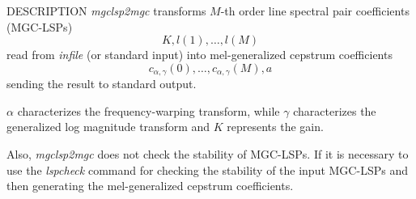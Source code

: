 \begin{synopsis}
\item [mgclsp2mgc] [ --a $A$ ] [ --g $G$ ] [ --m $M$ ] [ --i $I$ ]
 [ --s $S$ ] [ --l] [ {\em infile} ]
\end{synopsis}

\begin{qsection}{DESCRIPTION}
{\em mgclsp2mgc} transforms
$M$-th order line spectral pair coefficients (MGC-LSPs)
 \begin{displaymath}
  K, l(1), \ldots, l(M)
 \end{displaymath}
 read from {\em infile} (or standard input)
into mel-generalized cepstrum coefficients
 \begin{displaymath}
 c_{\alpha,\gamma}(0), \dots, c_{\alpha,\gamma}(M),a
 \end{displaymath}
sending the result to standard output.

$\alpha$ characterizes the frequency-warping transform,
 while $\gamma$ characterizes the generalized log magnitude transform
and $K$ represents the gain.

Also, {\em mgclsp2mgc} does not check the stability of MGC-LSPs.
 If it is necessary to use the {\em lspcheck} command
for checking the stability of the input MGC-LSPs and then
 generating the mel-generalized cepstrum coefficients.
\end{qsection}

\begin{options}
\end{options}

